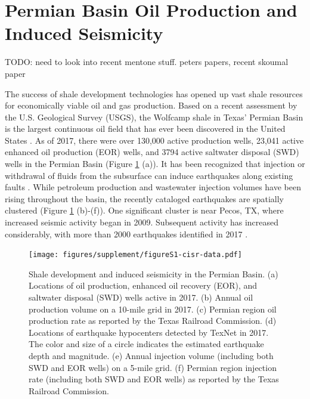 \documentclass{utexasthesis}
\begin{document}
\section{Permian Basin Oil Production and Induced Seismicity}

TODO: need to look into recent mentone stuff. peters papers, recent skoumal paper

The success of shale development technologies \cite{Waters2006use} has opened up vast shale resources for economically viable oil and gas production. Based on a recent assessment by the U.S. Geological Survey (USGS), the Wolfcamp shale in Texas' Permian Basin is the largest continuous oil field that has ever been discovered in the United States \cite{GaswirthAssessment2016}. As of 2017, there were over 130,000 active production wells, 23,041 active enhanced oil production (EOR) wells, and 3794 active saltwater disposal (SWD) wells in the Permian Basin (Figure \ref{fig:Permian} (a)). It has been recognized that injection or withdrawal of fluids from the subsurface can induce earthquakes along existing faults \cite{Ellsworth2013, simpson1988two}. While petroleum production and wastewater injection volumes have been rising throughout the basin, the recently cataloged earthquakes are spatially clustered (Figure \ref{fig:Permian} (b)-(f)). One significant cluster is near Pecos, TX, where increased seismic activity began in 2009. Subsequent activity has increased considerably, with more than 2000 earthquakes identified in 2017 \cite{Frohlich2019}.


\begin{figure}[hbt!]
\centering
\texttt{[image: figures/supplement/figureS1-cisr-data.pdf]}
\caption{Shale development and induced seismicity in the Permian Basin. (a) Locations of oil production, enhanced oil recovery (EOR), and saltwater disposal (SWD) wells active in 2017. (b) Annual oil production volume on a 10-mile grid in 2017. (c) Permian region oil production rate as reported by the Texas Railroad Commission. (d) Locations of earthquake hypocenters detected by TexNet in 2017. The color and size of a circle indicates the estimated earthquake depth and magnitude. (e) Annual injection volume (including both SWD and EOR wells) on a 5-mile grid. (f) Permian region injection rate (including both SWD and EOR wells) as reported by the Texas Railroad Commission.
}
\label{fig:Permian}
\end{figure}
\end{document}
